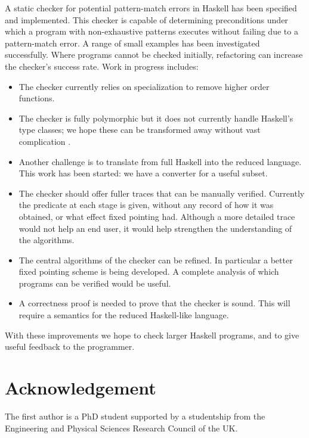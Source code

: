 \documentclass[book]{tfp05symp}
\begin{document}
A static checker for potential pattern-match errors in Haskell has
been specified and implemented. This checker is capable of
determining preconditions under which a program with non-exhaustive
patterns executes without failing due to a pattern-match error. A
range of small examples has been investigated successfully. Where
programs cannot be checked initially, refactoring can increase the
checker's success rate. Work in progress includes:

\begin{itemize}

\item The checker currently relies on specialization to remove higher order
functions.

\item The checker is fully polymorphic but it does not currently
handle Haskell's type classes; we hope these can be transformed away
without vast complication \cite{class_remove}.

\item Another challenge is to translate from full Haskell into the
reduced language. This work has been started: we have a converter
for a useful subset.

\item The checker should offer fuller traces that can
be manually verified. Currently the predicate at each stage is
given, without any record of how it was obtained, or what effect
fixed pointing had. Although a more detailed trace would not help an
end user, it would help strengthen the understanding of the
algorithms.

\item The central algorithms of the checker can be refined. In particular
a better fixed pointing scheme is being developed. A complete
analysis of which programs can be verified would be useful.

\item A correctness proof is needed to prove that the checker is
sound. This will require a semantics for the reduced Haskell-like
language.

\end{itemize}

With these improvements we hope to check larger Haskell programs,
and to give useful feedback to the programmer.

\section*{Acknowledgement}

The first author is a PhD student supported by a studentship from
the Engineering and Physical Sciences Research Council of the UK.



\end{document}
